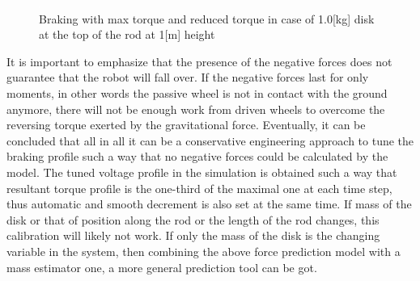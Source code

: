 \documentclass[12pt,english,twoside]{article}
\begin{document}
\begin{figure}[htb!]
	\centering
	\includegraphics[width=\textwidth]{figures/braking_1_0_kg_1_0_m}
	\caption{Braking with max torque and reduced torque in case of 1.0[kg] disk at the top of the rod at 1[m] height}
	\label{braking_1_0_kg_1_0_m}
\end{figure}

It is important to emphasize that the presence of the negative forces does not guarantee that the robot will fall over. If the negative forces last for only moments, in other words the passive wheel is not in contact with the ground anymore, there will not be enough work from driven wheels to overcome the reversing torque exerted by the gravitational force. Eventually, it can be concluded that all in all it can be a conservative engineering approach to tune the braking profile such a way that no negative forces could be calculated by the model. The tuned voltage profile in the simulation is obtained such a way that resultant torque profile is the one-third of the maximal one at each time step, thus automatic and smooth decrement is also set at the same time. If mass of the disk or that of position along the rod or the length of the rod changes, this calibration will likely not work. If only the mass of the disk is the changing variable in the system, then combining the above force prediction model with a mass estimator one, a more general prediction tool can be got.
\end{document}
